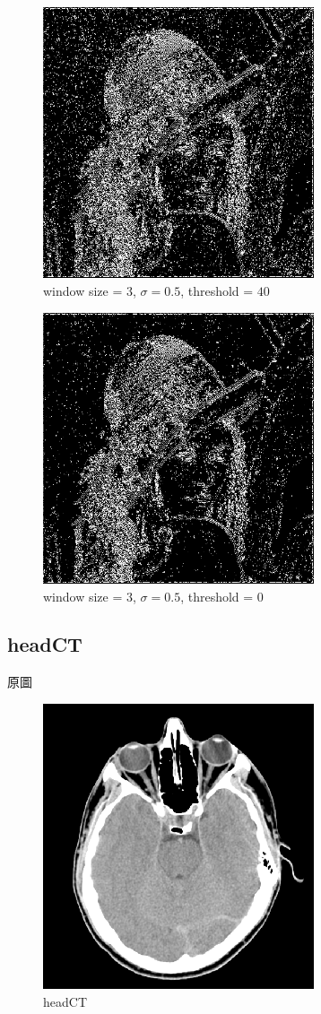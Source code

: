 \documentclass[conference]{IEEEtran}
\begin{document}
\begin{figure}[H]
\centerline{\includegraphics[width=8cm]{lena13.png}}
\caption{window size = $3$, $\sigma=0.5$,  threshold = $40$}
\label{lena13}
\end{figure}

\begin{figure}[H]
\centerline{\includegraphics[width=8cm]{lena14.png}}
\caption{window size = $3$, $\sigma=0.5$,  threshold = $0$}
\label{lena14}
\end{figure}

\subsection{headCT}

原圖

\begin{figure}[H]
\centerline{\includegraphics[width=8cm]{headCT.png}}
\caption{headCT}
\label{headCT}
\end{figure}
\end{document}

